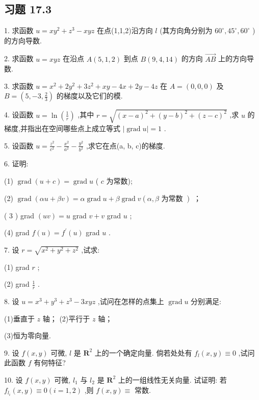 \subsection{习题 17.3}

1. 求函数 \(u = x{y}^{2} + {z}^{3} - {xyz}\) 在点(1,1,2)沿方向 \(l\) (其方向角分别为 \({60}^{ \circ  },{45}^{ \circ  },{60}^{ \circ  }\) ) 的方向导数.

2. 求函数 \(u = {xyz}\) 在沿点 \(A\left( {5,1,2}\right)\) 到点 \(B\left( {9,4,{14}}\right)\) 的方向 \(\overrightarrow{AB}\) 上的方向导数.

3. 求函数 \(u = {x}^{2} + 2{y}^{2} + 3{z}^{2} + {xy} - {4x} + {2y} - {4z}\) 在 \(A = \left( {0,0,0}\right)\) 及 \(B = \left( {5, - 3,\frac{2}{3}}\right)\) 的梯度以及它们的模.

4. 设函数 \(u = \ln \left( \frac{1}{r}\right)\) ,其中 \(r = \sqrt{{\left( x - a\right) }^{2} + {\left( y - b\right) }^{2} + {\left( z - c\right) }^{2}}\) ,求 \(u\) 的梯度,并指出在空间哪些点上成立等式 \(\left| {\operatorname{grad}u}\right|  = 1\) .

5. 设函数 \(u = \frac{{z}^{2}}{{c}^{2}} - \frac{{x}^{2}}{{a}^{2}} - \frac{{y}^{2}}{{b}^{2}}\) ,求它在点(a, b, c)的梯度.

6. 证明:

(1) \(\operatorname{grad}\left( {u + c}\right)  = \operatorname{grad}u\) ( \(c\) 为常数);

 (2) \(\operatorname{grad}\left( {{\alpha u} + {\beta v}}\right)  = \alpha \operatorname{grad}u + \beta \operatorname{grad}v\left( {\alpha ,\beta \text{ 为常数 }}\right)\) ；

( 3 ) grad \(\left( {uv}\right)  = u\) grad \(v + v\) grad \(u\) ;

(4) grad \(f\left( u\right)  = {f}^{\prime }\left( u\right)\) grad \(u\) .

7. 设 \(r = \sqrt{{x}^{2} + {y}^{2} + {z}^{2}}\) ,试求:

(1) grad \(r\) ;

(2) grad \(\frac{1}{r}\) .

8. 设 \(u = {x}^{3} + {y}^{3} + {z}^{3} - {3xyz}\) ,试问在怎样的点集上 \(\operatorname{grad}u\) 分别满足:

(1)垂直于 \(z\) 轴； (2)平行于 \(z\) 轴；

(3)恒为零向量.

9. 设 \(f\left( {x,y}\right)\) 可微, \(l\) 是 \({\mathbf{R}}^{2}\) 上的一个确定向量. 倘若处处有 \({f}_{l}\left( {x,y}\right)  \equiv  0\) ,试问此函数 \(f\) 有何特征?

10. 设 \(f\left( {x,y}\right)\) 可微, \({l}_{1}\) 与 \({l}_{2}\) 是 \({\mathbf{R}}^{2}\) 上的一组线性无关向量. 试证明: 若 \({f}_{{l}_{i}}\left( {x,y}\right)  \equiv  0\left( {i = 1,2}\right)\) ,则 \(f\left( {x,y}\right)  \equiv\) 常数.

